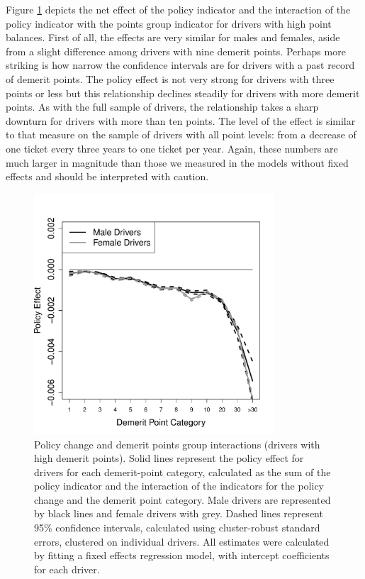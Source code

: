 Figure \ref{fig:FE_regs_high_pts} depicts
the net effect of the policy indicator and the interaction of the policy 
indicator with the points group indicator for drivers with high point balances. 
First of all, the effects are very similar for males and females, aside from a slight difference among 
drivers with nine demerit points. 
Perhaps more striking is how narrow the confidence intervals are for drivers with a past record of demerit points. 
The policy effect is not very strong for drivers with three points or less but this 
relationship declines steadily for drivers with more demerit points. 
As with the full sample of drivers, the relationship takes a sharp downturn for drivers
with more than ten points. 
The level of the effect is similar to that measure on the sample of drivers with all point levels:
from a decrease of one ticket every three years to one ticket per year. 
Again, these numbers are much larger in magnitude than those we measured in 
the models without fixed effects
and should be interpreted with caution. 

\begin{figure}
\centering
\includegraphics[width=0.8\textwidth]{Figures/FFX_reg_policy_points_grp_high_pts.pdf}
\caption{
Policy change and demerit points group interactions (drivers with high demerit points).
Solid lines represent the policy effect for drivers for each demerit-point category, 
calculated as the sum of the policy indicator and the interaction of the  indicators for the policy change 
and the demerit point category.  
Male drivers are represented by black lines and female drivers with grey. 
Dashed lines represent 95\% confidence intervals, 
calculated using cluster-robust standard errors, clustered on individual drivers. 
All estimates were calculated by fitting a fixed effects regression model, 
with intercept coefficients for each driver. 
}\label{fig:FE_regs_high_pts}
\end{figure}

